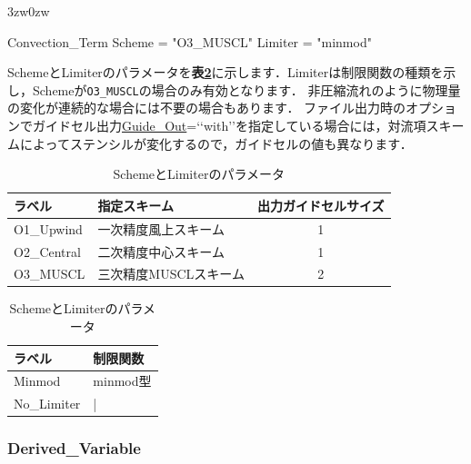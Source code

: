 \begin{indentation}{3zw}{0zw}

{\small
\begin{program}
  Convection_Term {
    Scheme  = "O3_MUSCL"
    Limiter = "minmod"
  }
\end{program}
}

SchemeとLimiterのパラメータを\textbf{表\ref{tbl:scheme limiter}}に示します．Limiterは制限関数の種類を示し，Schemeが\verb|O3_MUSCL|の場合のみ有効となります．
非圧縮流れのように物理量の変化が連続的な場合には不要の場合もあります．
ファイル出力時のオプションでガイドセル出力\hyperlink{tgt:fileio}{Guide\_Out}=\lq\lq with\rq\rq を指定している場合には，対流項スキームによってステンシルが変化するので，ガイドセルの値も異なります．

\begin{table}[htdp]
\small
\caption{SchemeとLimiterのパラメータ}
\begin{minipage}{.6\textwidth}
\begin{center}
\begin{tabular}{llc} \toprule
ラベル& 指定スキーム & 出力ガイドセルサイズ\\ \midrule
O1\_Upwind & 一次精度風上スキーム & 1\\
O2\_Central & 二次精度中心スキーム & 1\\
O3\_MUSCL & 三次精度MUSCLスキーム & 2\\ \bottomrule
\end{tabular}
\end{center}
\end{minipage} \hfill
\begin{minipage}{.38\textwidth}
\begin{center}
\begin{tabular}{ll} \toprule
ラベル & 制限関数\\ \midrule
Minmod & minmod型\\
No\_Limiter & | \\ \bottomrule
\end{tabular}
\end{center}
\end{minipage}
\label{tbl:scheme limiter}
\end{table}

\end{indentation}



\pagebreak
\subsubsection{Derived\_Variable}

